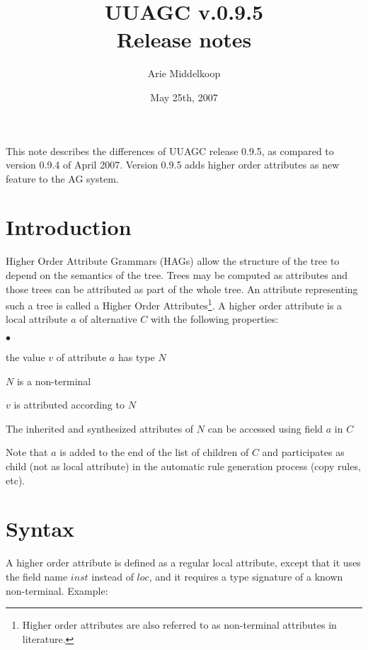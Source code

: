 \documentclass[twoside]{article}
\newenvironment{itize}{\begin{list}{$\bullet$}{\parsep=0pt\parskip=0pt\topsep=0pt\itemsep=0pt}}{\end{list}}
\begin{document}



\title{UUAGC v.0.9.5\\Release notes}

\author{Arie Middelkoop}

\date{May 25th, 2007}

\maketitle


This note describes the differences of UUAGC release 0.9.5,
as compared to version 0.9.4 of April 2007.
Version 0.9.5 adds higher order attributes as new feature to the AG system.


\section{Introduction}

Higher Order Attribute Grammars (HAGs) allow the structure of the tree to depend on the semantics of the tree. Trees may be computed as attributes and those trees can be attributed as part of the whole tree. An attribute representing such a tree is called a Higher Order Attributes\footnote{Higher order attributes are also referred to as non-terminal attributes in literature.}. A higher order attribute is a local attribute $a$ of alternative $C$ with the following properties:

\begin{itize}
\item the value $v$ of attribute $a$ has type $N$
\item $N$ is a non-terminal
\item $v$ is attributed according to $N$
\item The inherited and synthesized attributes of $N$ can be accessed using field $a$ in $C$
\end{itize}

Note that $a$ is added to the end of the list of children of $C$ and participates as child (not as local attribute) in the automatic rule generation process (copy rules, etc).


\section{Syntax}

A higher order attribute is defined as a regular local attribute, except that it uses the field name $inst$ instead of $loc$, and it requires a type signature of a known non-terminal. Example:
\end{document}
